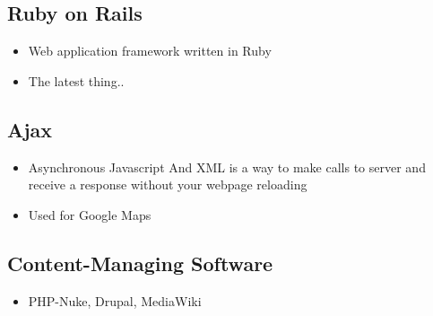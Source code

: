 \documentclass[10pt]
{article}
\begin{document}
\subsection{Ruby on Rails}
\begin{itemize}
\item Web application framework written in Ruby
\item The latest thing..

\end{itemize}
\subsection{Ajax}
\begin{itemize}
\item Asynchronous Javascript And XML is a way to make calls to server and receive a response without your webpage reloading
\item Used for Google Maps
\end{itemize}
\subsection{Content-Managing Software}
\begin{itemize}
\item PHP-Nuke, Drupal, MediaWiki

\end{itemize}
\end{document}
